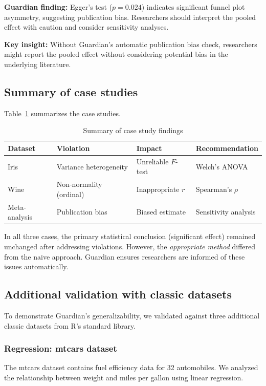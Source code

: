 \documentclass[article]{jss}
\begin{document}
\textbf{Guardian finding:} Egger's test ($p = 0.024$) indicates significant funnel plot asymmetry, suggesting publication bias. Researchers should interpret the pooled effect with caution and consider sensitivity analyses.

\textbf{Key insight:} Without Guardian's automatic publication bias check, researchers might report the pooled effect without considering potential bias in the underlying literature.

\subsection{Summary of case studies}

Table~\ref{tab:cases} summarizes the case studies.

\begin{table}[htbp]
\centering
\caption{Summary of case study findings}
\label{tab:cases}
\begin{tabular}{llll}
\toprule
Dataset & Violation & Impact & Recommendation \\
\midrule
Iris & Variance heterogeneity & Unreliable $F$-test & Welch's ANOVA \\
Wine & Non-normality (ordinal) & Inappropriate $r$ & Spearman's $\rho$ \\
Meta-analysis & Publication bias & Biased estimate & Sensitivity analysis \\
\bottomrule
\end{tabular}
\end{table}

In all three cases, the primary statistical conclusion (significant effect) remained unchanged after addressing violations. However, the \emph{appropriate method} differed from the naive approach. Guardian ensures researchers are informed of these issues automatically.

\subsection{Additional validation with classic datasets}

To demonstrate Guardian's generalizability, we validated against three additional classic datasets from R's standard library.

\subsubsection{Regression: mtcars dataset}

The mtcars dataset contains fuel efficiency data for 32 automobiles. We analyzed the relationship between weight and miles per gallon using linear regression.
\end{document}
